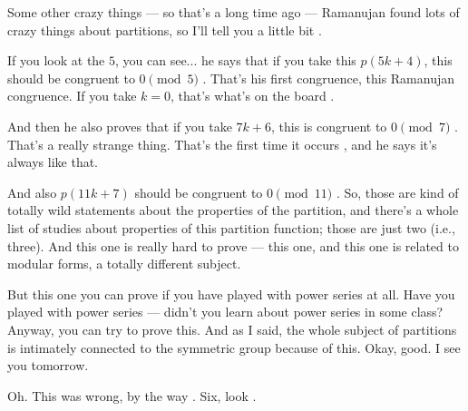 \begin{speech}[01:27:25 - 01:29:00]
Some other crazy things --- so that's a long time ago --- Ramanujan found lots of crazy things about partitions, so I'll tell you a little bit .

If you look at the $5$, you can see... he says that if you take this $p(5k + 4)$, this should be congruent to $0 \pmod 5$ . That's his first congruence, this Ramanujan congruence. If you take $k = 0$, that's what's on the board .

And then he also proves that if you take $7k + 6$, this is congruent to $0 \pmod 7$ . That's a really strange thing. That's the first time it occurs , and he says it's always like that.

And also $p(11k + 7)$ should be congruent to $0 \pmod{11}$ . So, those are kind of totally wild statements about the properties of the partition, and there's a whole list of studies about properties of this partition function; those are just two (i.e., three). And this one  is really hard to prove --- this one, and this one  is related to modular forms, a totally different subject.

But this one  you can prove if you have played with power series at all. Have you played with power series --- didn't you learn about power series in some class? Anyway, you can try to prove this. And as I said, the whole subject of partitions is intimately connected to the symmetric group because of this. Okay, good. I see you tomorrow.
\end{speech}

\begin{speech}[01:29:11 - 01:29:21]
Oh. This was wrong, by the way . Six, look .
\end{speech}

